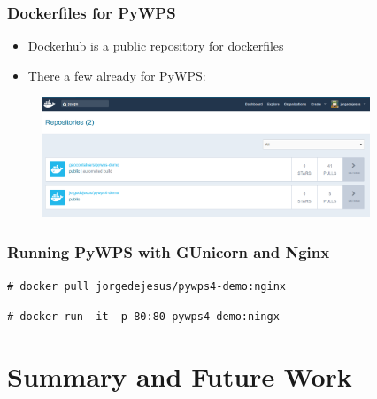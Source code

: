 \documentclass{beamer}
\begin{document}
\begin{frame}
\frametitle<presentation>{Dockerfiles for PyWPS}

\begin{itemize}
  \item Dockerhub is a public repository for dockerfiles
  \item There a few already for PyWPS:   
\end{itemize}

  \begin{figure}[ht]
   \centering
   \includegraphics[height=3.6cm]{figures/DockerfilesPyWPS}
  \end{figure}

\end{frame}

\begin{frame}
\frametitle<presentation>{Running PyWPS with GUnicorn and Nginx}

\texttt{\# docker pull jorgedejesus/pywps4-demo:nginx}

\texttt{\# docker run -it -p 80:80 pywps4-demo:ningx}

\end{frame}


\section{Summary and Future Work}
\end{document}
